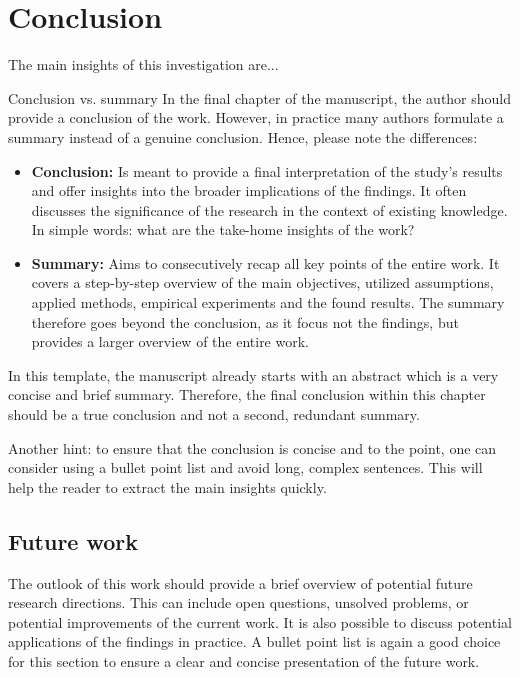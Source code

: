 \chapter{Conclusion} 
\label{cha:conclusion}

The main insights of this investigation are...
\begin{tbox}{Conclusion vs. summary}
In the final chapter of the manuscript, the author should provide a conclusion of the work. However, in practice many authors formulate a summary instead of a genuine conclusion. Hence, please note the differences:
\begin{itemize}
    \item \textbf{Conclusion:} Is meant to provide a final interpretation of the study's results and offer insights into the broader implications of the findings. It often discusses the significance of the research in the context of existing knowledge. In simple words: what are the take-home insights of the work?
    \item \textbf{Summary:} Aims to consecutively recap all key points of the entire work. It covers a step-by-step overview of the main objectives, utilized assumptions, applied methods, empirical experiments and the found results. The summary therefore goes beyond the conclusion, as it focus not the findings, but provides a larger overview of the entire work.
\end{itemize} 
In this template, the manuscript already starts with an abstract which is a very concise and brief summary. Therefore, the final conclusion within this chapter should be a true conclusion and not a second, redundant summary.   
\end{tbox}
Another hint: to ensure that the conclusion is concise and to the point, one can consider using a bullet point list and avoid long, complex sentences. This will help the reader to extract the main insights quickly.


\section{Future work}
\label{sec:futurework}
The outlook of this work should provide a brief overview of potential future research directions. This can include open questions, unsolved problems, or potential improvements of the current work. It is also possible to discuss potential applications of the findings in practice. A bullet point list is again a good choice for this section to ensure a clear and concise presentation of the future work. 

